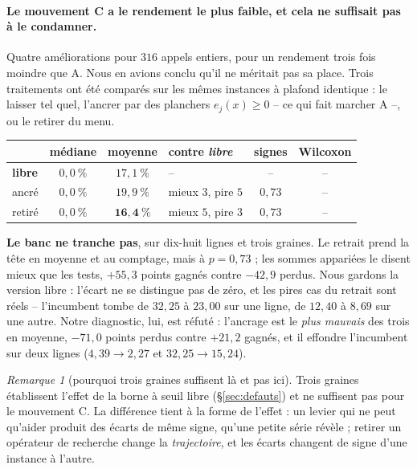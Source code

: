 \documentclass[11pt,a4paper]{article}
\theoremstyle{plain}
\theoremstyle{remark}
\newtheorem{remark}{Remarque}
\begin{document}
\paragraph{Le mouvement C a le rendement le plus faible, et cela ne
suffisait pas à le condamner.} Quatre améliorations pour $316$ appels
entiers, pour un rendement trois fois moindre que A. Nous en avions conclu
qu'il ne méritait pas sa place. Trois traitements ont été comparés sur les
mêmes instances à plafond identique : le laisser tel quel, l'ancrer par des
planchers $e_j(x)\ge0$ -- ce qui fait marcher A --, ou le retirer du menu.

\begin{center}
\begin{tabular}{lcclcc}
\toprule
& médiane & moyenne & contre \emph{libre} & signes & Wilcoxon\\
\midrule
\textbf{libre} & $0{,}0\ \%$ & $17{,}1\ \%$ & -- & -- & --\\
ancré & $0{,}0\ \%$ & $19{,}9\ \%$ & mieux $3$, pire $5$
 & $0{,}73$ & --\\
retiré & $0{,}0\ \%$ & $\mathbf{16{,}4\ \%}$ & mieux $5$, pire $3$
 & $0{,}73$ & --\\
\bottomrule
\end{tabular}
\end{center}

\noindent
\textbf{Le banc ne tranche pas}, sur dix-huit lignes et trois graines. Le
retrait prend la tête en moyenne et au comptage, mais à $p=0{,}73$ ; les
sommes appariées le disent mieux que les tests, $+55{,}3$ points gagnés
contre $-42{,}9$ perdus. Nous gardons la version libre : l'écart ne se
distingue pas de zéro, et les pires cas du retrait sont réels -- l'incumbent
tombe de $32{,}25$ à $23{,}00$ sur une ligne, de $12{,}40$ à $8{,}69$ sur
une autre. Notre diagnostic, lui, est réfuté : l'ancrage est le \emph{plus
mauvais} des trois en moyenne, $-71{,}0$ points perdus contre $+21{,}2$
gagnés, et il effondre l'incumbent sur deux lignes
($4{,}39\to2{,}27$ et $32{,}25\to15{,}24$).

\begin{remark}[pourquoi trois graines suffisent là et pas ici]
Trois graines établissent l'effet de la borne à seuil libre
(§\ref{sec:defauts}) et ne suffisent pas pour le mouvement C. La différence
tient à la forme de l'effet : un levier qui ne peut qu'aider produit des
écarts de même signe, qu'une petite série révèle ; retirer un opérateur de
recherche change la \emph{trajectoire}, et les écarts changent de signe
d'une instance à l'autre.
\end{remark}
\end{document}
